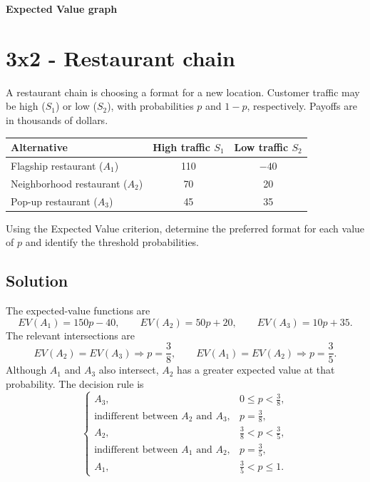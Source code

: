	\textbf{Expected Value graph}
	\begin{center}
	\end{center}

	\section{3x2 - Restaurant chain}

	A restaurant chain is choosing a format for a new location. Customer
	traffic may be high ($S_1$) or low ($S_2$), with probabilities $p$ and
	$1-p$, respectively. Payoffs are in thousands of dollars.

	\begin{center}
		\renewcommand{\arraystretch}{1.3}
		\begin{tabular}{lcc}
			\toprule
			Alternative & High traffic $S_1$ & Low traffic $S_2$ \\
			\midrule
			Flagship restaurant ($A_1$) & 110 & $-40$ \\
			Neighborhood restaurant ($A_2$) & 70 & 20 \\
			Pop-up restaurant ($A_3$) & 45 & 35 \\
			\bottomrule
		\end{tabular}
	\end{center}

	Using the Expected Value criterion, determine the preferred format for
	each value of $p$ and identify the threshold probabilities.

	\subsection{Solution}

	The expected-value functions are
	\[
		EV(A_1)=150p-40,\qquad
		EV(A_2)=50p+20,\qquad
		EV(A_3)=10p+35.
	\]
	The relevant intersections are
	\[
		EV(A_2)=EV(A_3)\Rightarrow p=\frac{3}{8},
		\qquad
		EV(A_1)=EV(A_2)\Rightarrow p=\frac{3}{5}.
	\]
	Although $A_1$ and $A_3$ also intersect, $A_2$ has a greater expected
	value at that probability. The decision rule is
	\[
		\boxed{
		\begin{cases}
			A_3, & 0\leq p<\frac{3}{8},\\
			\text{indifferent between }A_2\text{ and }A_3,
				& p=\frac{3}{8},\\
			A_2, & \frac{3}{8}<p<\frac{3}{5},\\
			\text{indifferent between }A_1\text{ and }A_2,
				& p=\frac{3}{5},\\
			A_1, & \frac{3}{5}<p\leq1.
		\end{cases}}
	\]

